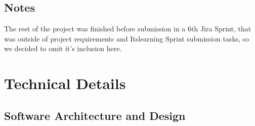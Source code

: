 \documentclass[12pt]{report}
\begin{document}
\section*{Notes}

The rest of the project was finished before submission in a 6th Jira Sprint, that was outside of project requirements
and Itslearning Sprint submission tasks, so we decided to omit it's inclusion here.


\chapter{Technical Details}

\section{Software Architecture and Design}
\end{document}
